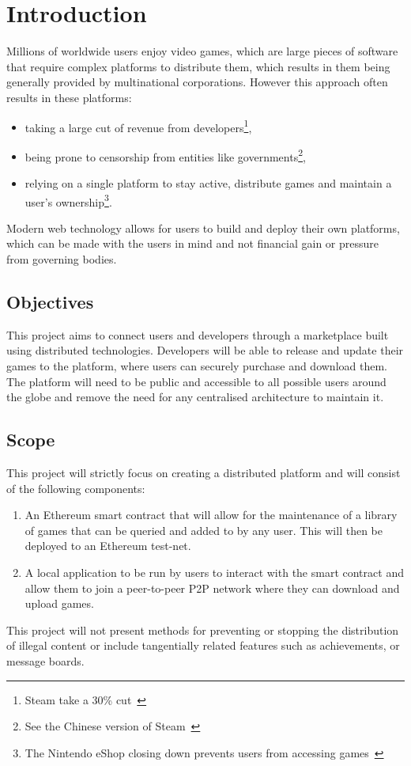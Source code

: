 
\chapter{Introduction}\label{sec:problem}

Millions of worldwide users enjoy video games, which are large pieces of software that require complex platforms to distribute them, which results in them being generally provided by multinational corporations. However this approach often results in these platforms:

\begin{itemize}
  \item taking a large cut of revenue from developers\footnote{Steam take a 30\% cut~\cite{marks_report_2019,brown_valve_2021}},
  \item being prone to censorship from entities like governments\footnote{See the Chinese version of Steam~\cite{noauthor_steam_nodate-1}},
  \item relying on a single platform to stay active, distribute games and maintain a user's ownership\footnote{The Nintendo eShop closing down prevents users from accessing games~\cite{noauthor_nintendo_2022}}.
\end{itemize}

\newparagraph
Modern web technology allows for users to build and deploy their own platforms, which can be made with the users in mind and not financial gain or pressure from governing bodies. 

\section{Objectives}

This project aims to connect users and developers through a marketplace built using distributed technologies. Developers will be able to release and update their games to the platform, where users can securely purchase and download them. The platform will need to be public and accessible to all possible users around the globe and remove the need for any centralised architecture to maintain it.

\section{Scope}

This project will strictly focus on creating a distributed platform and will consist of the following components:

\begin{enumerate}
  \item An Ethereum smart contract that will allow for the maintenance of a library of games that can be queried and added to by any user. This will then be deployed to an Ethereum test-net.
  \item A local application to be run by users to interact with the smart contract and allow them to join a peer-to-peer P2P network where they can download and upload games.
\end{enumerate}

\newparagraph
This project will not present methods for preventing or stopping the distribution of illegal content or include tangentially related features such as achievements, or message boards.
